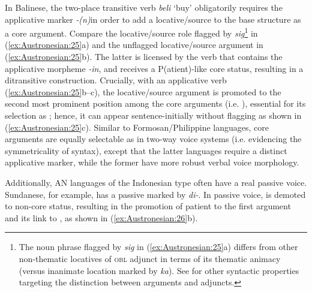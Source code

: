 \documentclass[output=paper,chinesefont]{../langscibook}
\begin{document}
In Balinese, the two-place transitive verb \emph{beli} `buy' obligatorily requires the applicative marker \emph{-(n)}in order to add a locative/source to the base structure as a core argument. Compare the locative/source role flagged by \emph{sig}\footnote{The noun phrase flagged by \emph{sig} in (\ref{ex:Austronesian:25}a) differs from other non-thematic locatives of \textsc{obl} adjunct in terms of its thematic animacy (versus inanimate location marked by \emph{ka}). See \citet{Arka2014b} for other syntactic properties targeting the distinction between arguments and adjuncts.} in (\ref{ex:Austronesian:25}a) and the unflagged locative/source argument in (\ref{ex:Austronesian:25}b). The latter is licensed by the verb that contains the applicative morpheme \emph{-in}, and receives a P(atient)-like core status, resulting in a ditransitive construction. Crucially, with an applicative verb (\ref{ex:Austronesian:25}b--c), the locative/source argument is promoted to the second most prominent position among the core arguments (i.e. ), essential for its selection as \SUBJ; hence, it can appear sentence-initially without flagging as shown in (\ref{ex:Austronesian:25}c). Similar to Formosan/Philippine languages, core arguments are equally selectable as \SUBJ in two-way voice systems (i.e. evidencing the symmetricality of syntax), except that the latter languages require a distinct applicative marker, while the former have more robust verbal voice morphology.

Additionally, AN languages of the Indonesian type often have a real passive voice. Sundanese, for example, has a passive marked by \emph{di-}. In passive voice,  is demoted to non-core status, resulting in the promotion of patient to the first argument and its link to \SUBJ, as shown in (\ref{ex:Austronesian:26}b).
\end{document}
